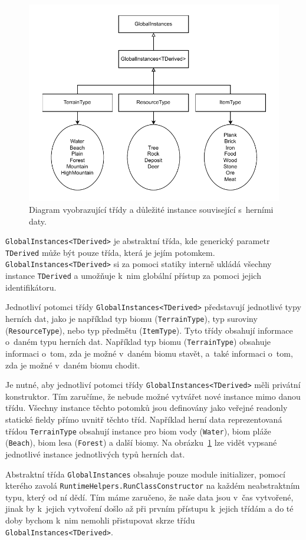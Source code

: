 \begin{figure}[!htb]
  \centering
  \includegraphics[width=0.7\linewidth]{img/game-data.pdf}
  \caption{Diagram vyobrazující třídy a důležité instance související s~herními daty.}
  \label{fig:game-data}
\end{figure}

\texttt{GlobalInstances<TDerived>} je abstraktní třída, kde generický parametr \texttt{TDerived} může být pouze třída, která je jejím potomkem. \texttt{GlobalInstances<TDerived>} si za pomoci statiky interně ukládá všechny instance \texttt{TDerived} a umožňuje k~nim globální přístup za pomoci jejich identifikátoru.

Jednotliví potomci třídy \texttt{GlobalInstances<TDerived>} představují jednotlivé typy herních dat, jako je například typ biomu (\texttt{TerrainType}), typ suroviny (\texttt{ResourceType}), nebo typ předmětu (\texttt{ItemType}). Tyto třídy obsahují informace o~daném typu herních dat. Například typ biomu (\texttt{TerrainType}) obsahuje informaci o~tom, zda je možné v~daném biomu stavět, a~také informaci o~tom, zda je možné v~daném biomu chodit.

Je nutné, aby jednotliví potomci třídy \texttt{GlobalInstances<TDerived>} měli privátní konstruktor. Tím zaručíme, že nebude možné vytvářet nové instance mimo danou třídu. Všechny instance těchto potomků jsou definovány jako veřejné readonly statické fieldy přímo uvnitř těchto tříd.  Například herní data reprezentovaná třídou \texttt{TerrainType} obsahují instance pro biom vody (\texttt{Water}), biom pláže (\texttt{Beach}), biom lesa (\texttt{Forest}) a další biomy. Na obrázku~\ref{fig:game-data} lze vidět vypsané jednotlivé instance jednotlivých typů herních dat.

Abstraktní třída \texttt{GlobalInstances} obsahuje pouze module initializer, pomocí kterého zavolá \texttt{RuntimeHelpers.RunClassConstructor} na každém neabstraktním typu, který od ní dědí. Tím máme zaručeno, že naše data jsou v~čas vytvořené, jinak by k~jejich vytvoření došlo až při prvním přístupu k~jejich třídám a do té doby bychom k~nim nemohli přistupovat skrze třídu \texttt{GlobalInstances<TDerived>}.

